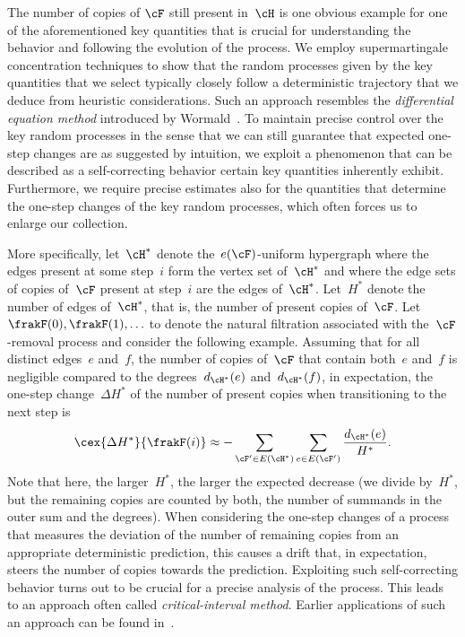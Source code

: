 \documentclass[11pt]{amsart}
\theoremstyle{definition}
\numberwithin{equation}{section}
\begin{document}
	The number of copies of $\cF$ still present in~$\cH$ is one obvious example for one of the aforementioned key quantities that is crucial for understanding the behavior and following the evolution of the process.
	We employ supermartingale concentration techniques to show that the random processes given by the key quantities that we select typically closely follow a deterministic trajectory that we deduce from heuristic considerations.
	Such an approach resembles the \emph{differential equation method} introduced by Wormald~\cite{W:99}.
	To maintain precise control over the key random processes in the sense that we can still guarantee that expected one-step changes are as suggested by intuition, we exploit a phenomenon that can be described as a self-correcting behavior certain key quantities inherently exhibit.
	Furthermore, we require precise estimates also for the quantities that determine the one-step changes of the key random processes, which often forces us to enlarge our collection.
 
	
	More specifically, let~$\cH^*$ denote the~$e(\cF)$-uniform hypergraph where the edges present at some step~$i$ form the vertex set of~$\cH^*$ and where the edge sets of copies of~$\cF$ present at step~$i$ are the edges of~$\cH^*$.
	Let~$H^*$ denote the number of edges of~$\cH^*$, that is, the number of present copies of~$\cF$.
	Let~$\frakF(0),\frakF(1),\ldots$ to denote the natural filtration associated with the~$\cF$-removal process and consider the following example.
	Assuming that for all distinct edges~$e$ and~$f$, the number of copies of~$\cF$ that contain both~$e$ and~$f$ is negligible compared to the degrees~$d_{\cH^*}(e)$ and~$d_{\cH^*}(f)$, in expectation, the one-step change~$\Delta H^*$ of the number of present copies when transitioning to the next step is
	\begin{equation}\label{equation: outline number of copies}
		\cex{\Delta H^*}{\frakF(i)}
		\approx-\sum_{\cF'\in E(\cH^*)}\sum_{e\in E(\cF')}\frac{d_{\cH^*}(e)}{H^*}.
	\end{equation}
	Note that here, the larger~$H^*$, the larger the expected decrease (we divide by~$H^*$, but the remaining copies are counted by both, the number of summands in the outer sum and the degrees).
	When considering the one-step changes of a process that measures the deviation of the number of remaining copies from an appropriate deterministic prediction, this causes a drift that, in expectation, steers the number of copies towards the prediction.
	Exploiting such self-correcting behavior turns out to be crucial for a precise analysis of the process.
	This leads to an approach often called \emph{critical-interval method}.
	Earlier applications of such an approach can be found in~\cite{BFL:18,BFL:15,BK:21,BP:12,PGM:20,TWZ:07}.
	
\end{document}
